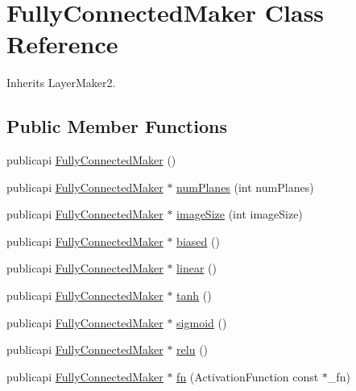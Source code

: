 \hypertarget{classFullyConnectedMaker}{\section{Fully\-Connected\-Maker Class Reference}
\label{classFullyConnectedMaker}
}


Inherits Layer\-Maker2.

\subsection*{Public Member Functions}
\begin{DoxyCompactItemize}
\item 
publicapi \hyperlink{classFullyConnectedMaker_adead12d4a37e3c8870f3dd8b86dba6a4}{Fully\-Connected\-Maker} ()
\item 
publicapi \hyperlink{classFullyConnectedMaker}{Fully\-Connected\-Maker} $\ast$ \hyperlink{classFullyConnectedMaker_a423334ce24eefa41eed24c478c796633}{num\-Planes} (int num\-Planes)
\item 
publicapi \hyperlink{classFullyConnectedMaker}{Fully\-Connected\-Maker} $\ast$ \hyperlink{classFullyConnectedMaker_a293d6f8da3375ef878ad1c4da788b87c}{image\-Size} (int image\-Size)
\item 
publicapi \hyperlink{classFullyConnectedMaker}{Fully\-Connected\-Maker} $\ast$ \hyperlink{classFullyConnectedMaker_a720ac826099b2bd0d8bdb824c03f2f46}{biased} ()
\item 
publicapi \hyperlink{classFullyConnectedMaker}{Fully\-Connected\-Maker} $\ast$ \hyperlink{classFullyConnectedMaker_a5b5f922b7ecc5e72b1ec05eccb75dcee}{linear} ()
\item 
publicapi \hyperlink{classFullyConnectedMaker}{Fully\-Connected\-Maker} $\ast$ \hyperlink{classFullyConnectedMaker_a431952fca7b766519e3285d61db0a607}{tanh} ()
\item 
publicapi \hyperlink{classFullyConnectedMaker}{Fully\-Connected\-Maker} $\ast$ \hyperlink{classFullyConnectedMaker_a876052fa0a8ce10156b558b2f05e0ac8}{sigmoid} ()
\item 
publicapi \hyperlink{classFullyConnectedMaker}{Fully\-Connected\-Maker} $\ast$ \hyperlink{classFullyConnectedMaker_af64f70a3947429e0f3e1cc9b79e5d22e}{relu} ()
\item 
publicapi \hyperlink{classFullyConnectedMaker}{Fully\-Connected\-Maker} $\ast$ \hyperlink{classFullyConnectedMaker_abed9af0a8c0c1e808d44eaf4888e18f2}{fn} (Activation\-Function const $\ast$\-\_\-fn)
\end{DoxyCompactItemize}
